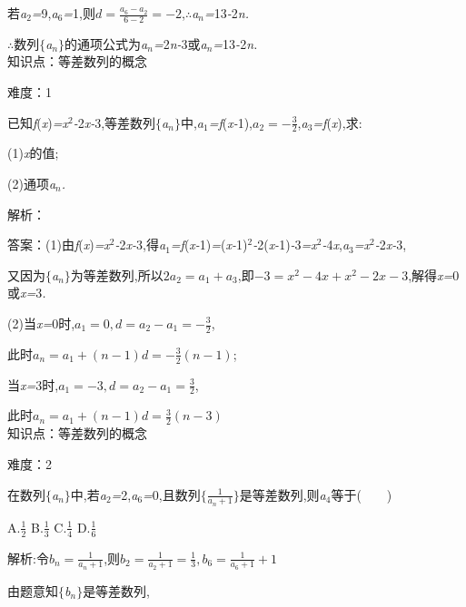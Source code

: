 \documentclass{article} %
\begin{document}
若\textit{a}${}_{2}$\textit{=}9,\textit{a}${}_{6}$\textit{=}1,则$d = \frac{a_6 -a_2}{6-2} = -2$,\textit{$\therefore$a${}_{n}$=}13\textit{-}2\textit{n.}

\textit{$\therefore$}数列$\mathrm{\{}$\textit{a${}_{n}$}$\mathrm{\}}$的通项公式为\textit{a${}_{n}$=}2\textit{n-}3或\textit{a${}_{n}$=}13\textit{-}2\textit{n.} \\

知识点：等差数列的概念

难度：1

 已知\textit{f}(\textit{x})\textit{=x}${}^{2}$\textit{-}2\textit{x-}3,等差数列$\mathrm{\{}$\textit{a${}_{n}$}$\mathrm{\}}$中,\textit{a}${}_{1}$\textit{=f}(\textit{x-}1),$a_2=-\frac{3}{2}$,\textit{a}${}_{3}$\textit{=f}(\textit{x}),求:

 (1)\textit{x}的值;

 (2)通项\textit{a${}_{n}$.}

解析：

 答案：(1)由\textit{f}(\textit{x})\textit{=x}${}^{2}$\textit{-}2\textit{x-}3,得\textit{a}${}_{1}$\textit{=f}(\textit{x-}1)\textit{=}(\textit{x-}1)${}^{2}$\textit{-}2(\textit{x-}1)\textit{-}3\textit{=x}${}^{2}$\textit{-}4\textit{x},\textit{a}${}_{3}$\textit{=x}${}^{2}$\textit{-}2\textit{x-}3,

又因为$\mathrm{\{}$\textit{a${}_{n}$}$\mathrm{\}}$为等差数列,所以$2a_2=a_1+a_3$,即$-3=x^2-4x+x^2-2x-3$,解得\textit{x=}0或\textit{x=}3\textit{.}

(2)当\textit{x=}0时,$a_1=0,d=a_2-a_1=-\frac{3}{2}$,

此时$a_n = a_1+(n-1)d=-\frac{3}{2}(n-1)$;

当\textit{x=}3时,$a_1=-3,d=a_2-a_1=\frac{3}{2}$,

此时$a_n = a_1+(n-1)d=\frac{3}{2}(n-3)$ \\

知识点：等差数列的概念

难度：2

 在数列$\mathrm{\{}$\textit{a${}_{n}$}$\mathrm{\}}$中,若\textit{a}${}_{2}$\textit{=}2,\textit{a}${}_{6}$\textit{=}0,且数列$\{\frac{1}{a_n+1}\}$是等差数列,则\textit{a}${}_{4}$等于(\textit{　　})

 A.$\frac{1}{2}$ B.$\frac{1}{3}$ C.$\frac{1}{4}$ D.$\frac{1}{6}$

 解析:令$b_n = \frac{1}{a_n+1}$,则$b_2 = \frac{1}{a_2+1}=\frac{1}{3},b_6=\frac{1}{a_6+1}+1$

由题意知$\mathrm{\{}$\textit{b${}_{n}$}$\mathrm{\}}$是等差数列,
\end{document}
